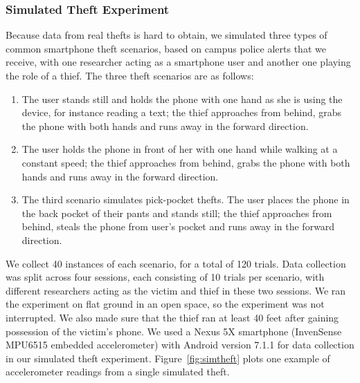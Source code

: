 \subsubsection{Simulated Theft Experiment}
Because data from real thefts is hard to obtain, we simulated three types of common smartphone theft scenarios, based on campus police alerts that we receive, with one researcher acting as a smartphone user and another one playing the role of a thief. 
The three theft scenarios are as follows:
\begin{enumerate}
\item The user stands still and holds the phone with one hand as she is using the device, for instance reading a text; the thief approaches from behind, grabs the phone with both hands and runs away in the forward direction. 
\item The user holds the phone in front of her with one hand while walking at a constant speed; the thief approaches from behind, grabs the phone with both hands and runs away in the forward direction. 
\item The third scenario simulates pick-pocket thefts. The user places the phone in the back pocket of their pants and stands still; the thief approaches from behind, steals the phone from user's pocket and runs away in the forward direction.
\end{enumerate}
We collect 40 instances of each scenario, for a total of 120 trials. 
Data collection was split across four sessions, each consisting of 10 trials per scenario, with different researchers acting as the victim and thief in these two sessions. 
We ran the experiment on flat ground in an open space, so the experiment was not interrupted. 
We also made sure that the thief ran at least 40 feet after gaining possession of the victim's phone.
We used a Nexus 5X smartphone (InvenSense MPU6515 embedded accelerometer) with Android version 7.1.1 for data collection in our simulated theft experiment.
Figure~\ref{fig:simtheft} plots one example of accelerometer readings from a single simulated theft.



